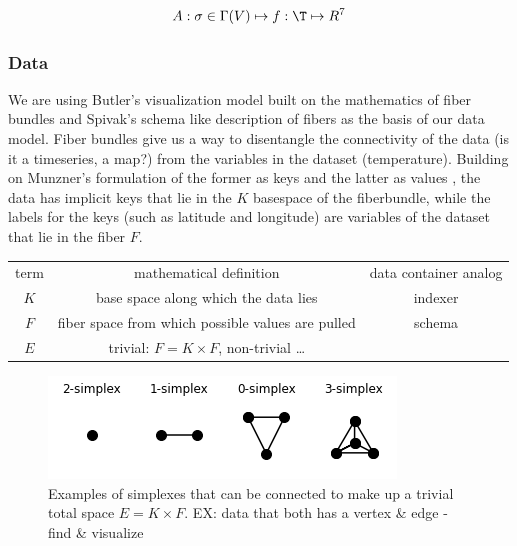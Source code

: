 \documentclass[../intro.tex]{subfiles}
\begin{document}
\begin{equation}
    A: {\sigma \in \Gamma(V)}\mapsto f:\T \mapsto R^{7}
\end{equation}

\subsubsection{Data}
We are using Butler's visualization model built on the mathematics of fiber bundles \cite{butlerVectorBundleClassesForm1992,butlerVisualizationModelBased1989} and Spivak's schema like description of fibers \cite{spivakSIMPLICIALDATABASES} as the basis of our data model. Fiber bundles give us a way to disentangle the connectivity of the data (is it a timeseries, a map?) from the variables in the dataset (temperature). Building on Munzner's formulation of the former as keys and the latter as values \cite{munznerWhatDataAbstraction2014}, the data has implicit keys that lie in the $K$ basespace of the fiberbundle, while the labels for the keys (such as latitude and longitude) are variables of the dataset that lie in the fiber $F$. 


\begin{center}
    \begin{tabular}{ c c c }
     term & mathematical definition & data container analog\\
      $K$ & base space along which the data lies & indexer \\
      $F$ & fiber space from which possible values are pulled & schema \\
      $E$ & trivial: $F= K \times F$, non-trivial \dots & 
    \end{tabular}
\end{center}




\begin{figure}
    \includegraphics{figures/sections/math/simplex.png}
    \caption{Examples of simplexes that can be connected to make up a trivial total space $E = K\times F$.
    EX: data that both has a vertex & edge - find & visualize}
\end{figure}
\end{document}
